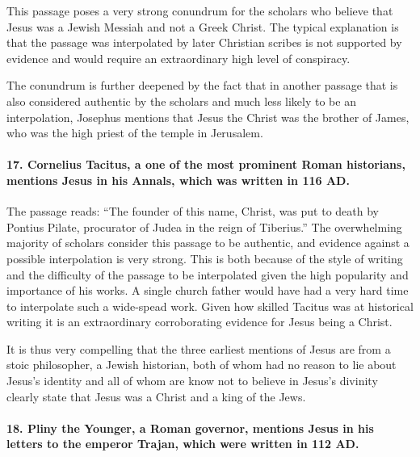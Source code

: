 This passage poses a very strong conundrum for the scholars who believe that Jesus was a Jewish Messiah and not a Greek Christ.
The typical explanation is that the passage was interpolated by later Christian scribes is not supported by evidence and would require an extraordinary high level of conspiracy.

The conundrum is further deepened by the fact that in another passage that is also considered authentic by the scholars and much less likely to be an interpolation, Josephus mentions that Jesus the Christ was the brother of James, who was the high priest of the temple in Jerusalem.

\paragraph{17.
Cornelius Tacitus, a one of the most prominent Roman historians, mentions Jesus in his Annals, which was written in 116 AD.}\label{par:cornelius-tacitus-a-one-of-the-most-prominent-roman-historians-mentions-jesus-in-his-annals-which-was-written-in-116-ad.}

The passage reads: ``The founder of this name, Christ, was put to death by Pontius Pilate, procurator of Judea in the reign of Tiberius.'' The overwhelming majority of scholars consider this passage to be authentic, and evidence against a possible interpolation is very strong.
This is both because of the style of writing and the difficulty of the passage to be interpolated given the high popularity and importance of his works.
A single church father would have had a very hard time to interpolate such a wide-spead work.
Given how skilled Tacitus was at historical writing it is an extraordinary corroborating evidence for Jesus being a Christ.

It is thus very compelling that the three earliest mentions of Jesus are from a stoic philosopher, a Jewish historian, both of whom had no reason to lie about Jesus's identity and all of whom are know not to believe in Jesus's divinity clearly state that Jesus was a Christ and a king of the Jews.

\paragraph{18.
Pliny the Younger, a Roman governor, mentions Jesus in his letters to the emperor Trajan, which were written in 112 AD.}\label{par:pliny-the-younger-a-roman-governor-mentions-jesus-in-his-letters-to-the-emperor-trajan-which-were-written-in-112-ad.}

